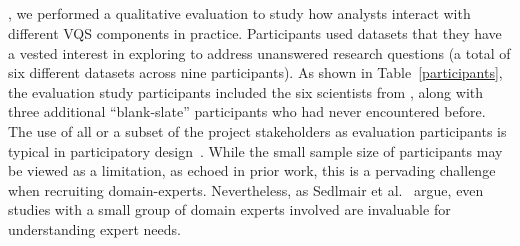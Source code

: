   \subsection{}
  , we performed a qualitative evaluation to study how analysts interact with different VQS components in practice. Participants used datasets that they have a vested interest in exploring to address unanswered research questions (a total of six different datasets across nine participants). As shown in Table~\ref{participants}, the evaluation study participants included the six scientists from , along with three additional ``blank-slate'' participants who had never encountered \zvpp before. The use of all or a subset of the project stakeholders as evaluation participants is typical in participatory design~\cite{Bossen2016}. While the small sample size of participants may be viewed as a limitation, as echoed in prior work\cite{Batch2018,Mclachlan2008}, this is a pervading challenge when recruiting domain-experts. Nevertheless, as Sedlmair et al.~\cite{Sedlmair2012} argue, even studies with a small group of domain experts involved are invaluable for understanding expert needs. %
